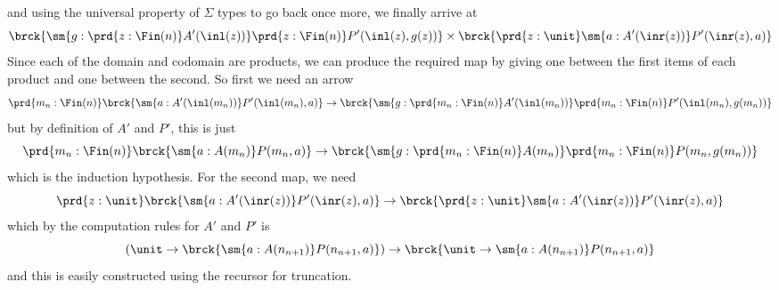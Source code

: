 and using the universal property of $\Sigma$ types to go back once more, we
finally arrive at
\[
  \brck{
    \sm{g : \prd{z : \Fin(n)} A'(\inl(z))} 
    \prd{z : \Fin(n)} 
    P'(\inl(z), g(z))
  }
    \times
  \brck{
    \prd{z : \unit} 
    \sm{a : A'(\inr(z))}
    P'(\inr(z), a)
  }
\]
Since each of the domain and codomain are products, we can produce the required
map by giving one between the first items of each product and one between the
second.  So first we need an arrow
\[
  \prd{m_{n} : \Fin(n)} \brck{\sm{a : A'(\inl(m_{n}))} P'(\inl(m_{n}), a)}
  \to
  \brck{
    \sm{g : \prd{m_{n} : \Fin(n)} A'(\inl(m_{n}))}
    \prd{m_{n} : \Fin(n)}
    P'(\inl(m_{n}), g(m_{n}))
  }
\]
but by definition of $A'$ and $P'$, this is just
\[
  \prd{m_{n} : \Fin(n)} \brck{\sm{a : A(m_{n})} P(m_{n}, a)}
  \to
  \brck{
    \sm{g : \prd{m_{n} : \Fin(n)} A(m_{n})}
    \prd{m_{n} : \Fin(n)}
    P(m_{n}, g(m_{n}))
  }
\]
which is the induction hypothesis. For the second map, we need
\[
  \prd{z : \unit}\brck{\sm{a : A'(\inr(z))} P'(\inr(z), a)}
  \to
  \brck{\prd{z : \unit}\sm{a : A'(\inr(z))} P'(\inr(z), a)}
\]
which by the computation rules for $A'$ and $P'$ is
\[
  \left(\unit \to \brck{\sm{a : A(n_{n+1})} P(n_{n+1}, a)}\right)
  \to
  \brck{\unit \to \sm{a : A(n_{n+1})} P(n_{n+1}, a)}
\]
and this is easily constructed using the recursor for truncation.
